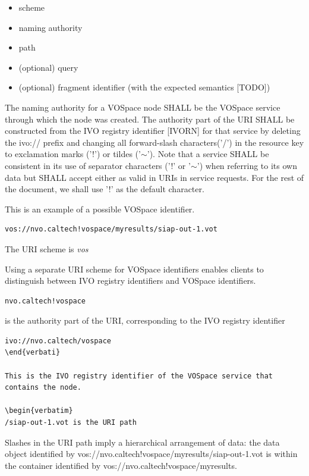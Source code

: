 \documentclass[11pt,a4paper]{ivoa}
\begin{document}
\begin{itemize}
  \item scheme
  \item naming authority
  \item path
  \item (optional) query
  \item (optional) fragment identifier (with the expected semantics [TODO])
\end{itemize}

The naming authority for a VOSpace node SHALL be the VOSpace service through which the node was created. The authority part of the URI SHALL be constructed from the IVO registry identifier [IVORN] for that service by deleting the ivo:// prefix and changing all forward-slash characters('/') in the resource key to exclamation marks ('!') or tildes ('$\mathtt{\sim}$'). Note that a service SHALL be consistent in its use of separator characters ('!' or '$\mathtt{\sim}$') when referring to its own data but SHALL accept either as valid in URIs in service requests. For the rest of the document, we shall use '!' as the default character.

This is an example of a possible VOSpace identifier.

\begin{verbatim}
vos://nvo.caltech!vospace/myresults/siap-out-1.vot
\end{verbatim}

The URI scheme is \emph{vos}

Using a separate URI scheme for VOSpace identifiers enables clients to distinguish between IVO registry identifiers and VOSpace identifiers.

\begin{verbatim}
nvo.caltech!vospace
\end{verbatim}

is the authority part of the URI, corresponding to the IVO registry identifier

\begin{verbatim}
ivo://nvo.caltech/vospace
\end{verbati}

This is the IVO registry identifier of the VOSpace service that contains the node.

\begin{verbatim}
/siap-out-1.vot is the URI path
\end{verbatim}

Slashes in the URI path imply a hierarchical arrangement of data: the data object identified by vos://nvo.caltech!vospace/myresults/siap-out-1.vot is within the container identified by vos://nvo.caltech!vospace/myresults.
\end{document}
